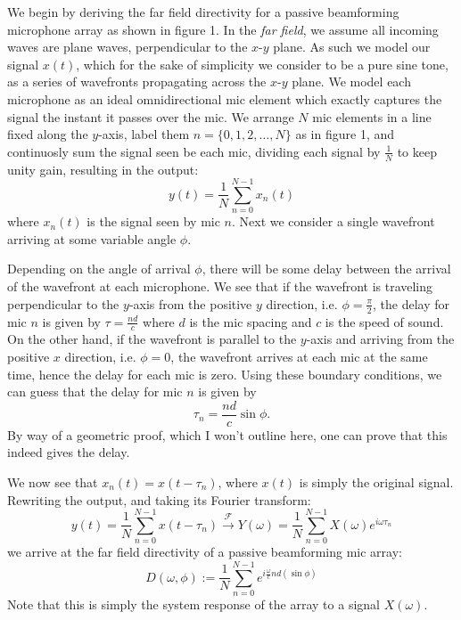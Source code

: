 \documentclass{article}
\begin{document}
  We begin by deriving the far field directivity for a passive beamforming microphone array
  as shown in figure 1. In the \emph{far field}, we assume all incoming waves are plane waves, perpendicular
  to the $x$-$y$ plane. As such we model our signal $x(t)$, which for the sake of simplicity we consider to be
  a pure sine tone, as a series of wavefronts propagating across the $x$-$y$ plane. We model each
  microphone as an ideal omnidirectional mic element which exactly captures the signal the instant it
  passes over the mic. We arrange $N$ mic elements in a line fixed along the $y$-axis, label them $n = \{0,1,2,\dots,N \}$ as in
  figure 1, and continuosly sum the signal seen be each mic, dividing each signal by $\frac{1}{N}$ to
  keep unity gain, resulting in the output:
  $$ y(t) = \frac{1}{N} \displaystyle\sum_{n=0}^{N-1} x_n (t) $$
  where $x_n (t)$ is the signal seen by mic $n$. Next we consider a single wavefront arriving at some
  variable angle $\phi$.

  Depending on the angle of arrival $\phi$, there will be some delay between the
  arrival of the wavefront at each microphone.
  We see that if the wavefront is traveling perpendicular to
  the $y$-axis from the positive $y$ direction, i.e. $\phi = \frac{\pi}{2}$, the delay for mic $n$ is given
  by $\tau = \frac{nd}{c}$ where $d$ is the mic spacing and $c$ is the speed of sound.
  On the other hand, if the wavefront is parallel to the $y$-axis and arriving from the positive $x$ direction,
  i.e. $\phi = 0$, the wavefront arrives at each mic at the same time, hence the delay for each mic is zero.
  Using these boundary conditions, we can guess that the delay for mic $n$ is given by
  \begin{equation}
    \tau_n = \frac{nd}{c} \sin{\phi}.
  \end{equation}
  By way of a geometric proof, which I won't outline here, one can prove that this indeed gives the delay.

  We now see that $x_n (t) = x(t - \tau_n)$, where $x(t)$ is simply the original signal. Rewriting the output,
  and taking its Fourier transform:
  $$ y(t) = \frac{1}{N} \displaystyle\sum_{n=0}^{N-1} x(t-\tau_n) \xrightarrow{\mathcal{F}} Y(\omega) = \frac{1}{N} \displaystyle\sum_{n=0}^{N-1} X(\omega) e^{i \omega \tau_n} $$
  we arrive at the far field directivity of a passive beamforming mic array:
  \begin{equation}
    D(\omega,\phi) := \frac{1}{N} \displaystyle\sum_{n=0}^{N-1} e^{i \frac{\omega}{c} nd (\sin{\phi})}
  \end{equation}
  Note that this is simply the system response of the array to a signal $X(\omega)$.
\end{document}
